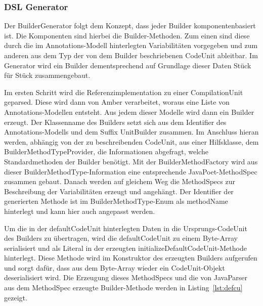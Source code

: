 \documentclass[12pt,oneside,a4paper,parskip]{scrbook}
\begin{document}
\subsubsection{DSL Generator}\label{sec:dslgen}

Der BuilderGenerator folgt dem Konzept, dass jeder Builder komponentenbasiert ist. Die Komponenten sind hierbei die Builder-Methoden. Zum einen sind diese durch die im Annotations-Modell hinterlegten Variabilitäten vorgegeben und zum anderen aus dem Typ der von dem Builder beschriebenen CodeUnit ableitbar. Im Generator wird ein Builder dementsprechend auf Grundlage dieser Daten Stück für Stück zusammengebaut.

Im ersten Schritt wird die Referenzimplementation zu einer CompilationUnit geparsed. Diese wird dann von Amber verarbeitet, woraus eine Liste von Annotations-Modellen entsteht. Aus jedem dieser Modelle wird dann ein Builder erzeugt. Der Klassenname des Builders setzt sich aus dem Identifier des Annotations-Modells und dem Suffix UnitBuilder zusammen. Im Anschluss hieran werden, abhängig von der zu beschreibenden CodeUnit, aus einer Hilfsklasse, dem BuilderMethodTypeProvider, die Informationen abgefragt, welche Standardmethoden der Builder benötigt. Mit der BuilderMethodFactory wird aus dieser BuilderMethodType-Information eine entsprechende JavaPoet-MethodSpec zusammen gebaut. Danach werden auf gleichem Weg die MethodSpecs zur Beschreibung der Variabilitäten erzeugt und angehängt. Der Identifier der generierten Methode ist im BuilderMethodType-Enum als methodName hinterlegt und kann hier auch angepasst werden.

Um die in der defaultCodeUnit hinterlegten Daten in die Ursprungs-CodeUnit des Builders zu übertragen, wird die defaultCodeUnit zu einem Byte-Array serialisiert und als Literal in der erzeugten initializeDefaultCodeUnit-Methode hinterlegt. Diese Methode wird im Konstruktor des erzeugten Builders aufgerufen und sorgt dafür, dass aus dem Byte-Array wieder ein CodeUnit-Objekt deserialisiert wird. Die Erzeugung dieses MethodSpecs und die von JavaParser aus dem MethodSpec erzeugte Builder-Methode werden in Listing~\ref{lst:defcu} gezeigt.
\end{document}
